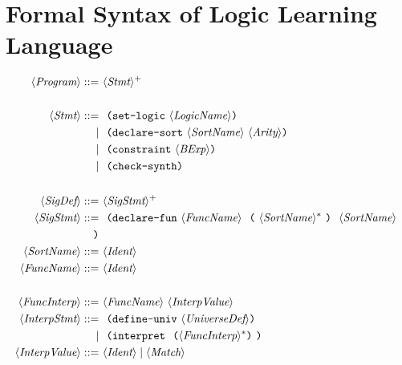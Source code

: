 \section*{Formal Syntax of Logic Learning Language}

\begin{align*}
     \Program             ::=~       & \Stmt^+                                                                                \\
     \\
     \Stmt                ::=~       & \SetLogic{\Logic}                                                         \\
     \mid~                           & \DeclareSort{\Sort}{\Arity}                                                \\
     \mid~                           & \Constraint{\Bexp}                                                                      \\
     \mid~                           & \CheckSynth                                                                              \\
     \\
     \SigDef           ::=~          & \SigStmt^+                                                                             \\
     \SigStmt       ::=~             & \DeclareFun{\Func}{\Sort^*}{\Sort}                            \\
     \\
     \Sort                ::=~       & \Ident                                                                                 \\
     \Func           ::=~            & \Ident                                                                                 \\
     \\
     \FuncInterp ::=~                & \Func~\InterpValue                                                                     \\
     \InterpStmt  ::=~               & \Lparen\DefineUniverse~\UniverseDef\Rparen                                             \\
     \mid~                           & \Lparen\Interpret~\Lparen\FuncInterp^*\Rparen\Rparen                                   \\
     \InterpValue ::=~               & \Ident \mid \Match                                                                     \\

\end{align*}
